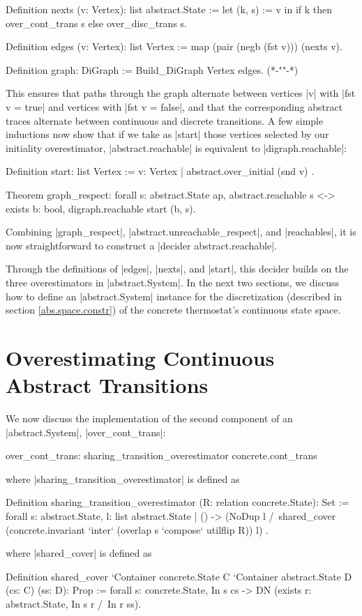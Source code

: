 \documentclass[runningheads]{llncs}
\begin{document}
\begin{code}
  Definition nexts (v: Vertex): list abstract.State :=
    let (k, s) := v in
      if k then over_cont_trans s
      else over_disc_trans s.

  Definition edges (v: Vertex): list Vertex := map (pair (negb (fst v))) (nexts v).

  Definition graph: DiGraph := Build_DiGraph Vertex edges.
    (*{-""-}*)
\end{code}
This ensures that paths through the graph alternate between vertices |v| with |fst v = true| and vertices with |fst v = false|, and that the corresponding abstract traces alternate between continuous and discrete transitions. A few simple inductions now show that if we take as |start| those vertices selected by our initiality overestimator, |abstract.reachable| is equivalent to |digraph.reachable|:
\begin{code}
  Definition start: list Vertex := { v: Vertex | abstract.over_initial (snd v) }.

  Theorem graph_respect: forall s: abstract.State ap,
    abstract.reachable s <-> exists b: bool, digraph.reachable start (b, s).
\end{code}

Combining |graph_respect|, |abstract.unreachable_respect|, and |reachables|, it is now straightforward to construct a |decider abstract.reachable|.

Through the definitions of |edges|, |nexts|, and |start|, this decider builds on the three overestimators in |abstract.System|. In the next two sections, we discuss how to define an |abstract.System| instance for the discretization (described in section \ref{abs.space.constr}) of the concrete thermostat's continuous state space.

\section{Overestimating Continuous Abstract Transitions}
\label{over_cont_trans}

We now discuss the implementation of the second component of an |abstract.System|, |over_cont_trans|:
\begin{code}
  over_cont_trans: sharing_transition_overestimator concrete.cont_trans
\end{code}
where |sharing_transition_overestimator| is defined as
\begin{code}
Definition sharing_transition_overestimator
  (R: relation concrete.State): Set := forall s: abstract.State,
    { l: list abstract.State | () -> (NoDup l /\ shared_cover
      (concrete.invariant `inter` (overlap s `compose` utilflip R)) l) }.
\end{code}
where |shared_cover| is defined as
\begin{code}
  Definition shared_cover
    `{Container concrete.State C} `{Container abstract.State D}
      (cs: C) (ss: D): Prop :=
        forall s: concrete.State, In s cs -> DN (exists r: abstract.State, In s r /\ In r ss).
\end{code}
\end{document}

